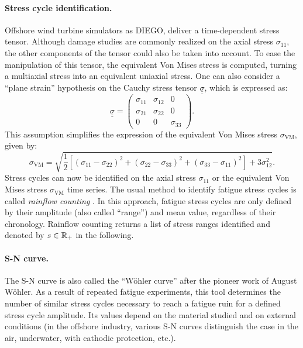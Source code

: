 \paragraph{Stress cycle identification.}
Offshore wind turbine simulators as DIEGO, deliver a time-dependent stress tensor. 
Although damage studies are commonly realized on the axial stress $\sigma_11$, the other components of the tensor could also be taken into account. 
To ease the manipulation of this tensor, the equivalent Von Mises stress is computed, turning a multiaxial stress into an equivalent uniaxial stress. 
One can also consider a ``plane strain'' hypothesis on the Cauchy stress tensor $\underline{\underline{\sigma}}$, which is expressed as:
\begin{equation}
    \underline{\underline{\sigma}} = \begin{pmatrix}
                            \sigma_{11} & \sigma_{12} & 0\\
                            \sigma_{21} & \sigma_{22} & 0\\
                            0 & 0 & \sigma_{33}
                            \end{pmatrix}.
\end{equation}
This assumption simplifies the expression of the equivalent Von Mises stress $\sigma_{\mathrm{VM}}$, given by: 
\begin{equation}
    \sigma_{\mathrm{VM}}=\sqrt{{\frac {1}{2}}\left[(\sigma _{11}-\sigma _{22})^{2}+(\sigma _{22}-\sigma _{33})^{2}+(\sigma _{33}-\sigma _{11})^{2}\right] + 3 \sigma _{12}^{2}}.
\end{equation}
Stress cycles can now be identified on the axial stress $\sigma_11$ or the equivalent Von Mises stress $\sigma_{\mathrm{VM}}$ time series. 
The usual method to identify fatigue stress cycles is called \textit{rainflow counting} \citep{dowling_1972}. 
In this approach, fatigue stress cycles are only defined by their amplitude (also called ``range'') and mean value, regardless of their chronology. 
Rainflow counting returns a list of stress ranges identified and denoted by $s \in \mathbb{R}_+$ in the following. 


\paragraph{S-N curve.}
The S-N curve is also called the ``W\"ohler curve'' after the pioneer work of August W\"ohler. %
As a result of repeated fatigue experiments, this tool determines the number of similar stress cycles necessary to reach a fatigue ruin for a defined stress cycle amplitude. 
Its values depend on the material studied and on external conditions (in the offshore industry, various S-N curves distinguish the case in the air, underwater, with cathodic protection, etc.). 

